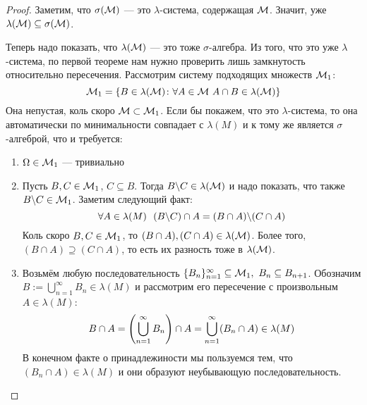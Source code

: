 \begin{proof}
	Заметим, что $\sigma(\mathcal{M})$ --- это $\lambda$-система, содержащая $\mathcal{M}$. Значит, уже $\lambda(\mathcal{M}) \subseteq \sigma(\mathcal{M})$.
	
	Теперь надо показать, что $\lambda(\mathcal{M})$ --- это тоже $\sigma$-алгебра. Из того, что это уже $\lambda$-система, по первой теореме нам нужно проверить лишь замкнутость относительно пересечения. Рассмотрим систему подходящих множеств $\mathcal{M}_1$:
	\[
		\mathcal{M}_1 = \{B \in \lambda(\mathcal{M}) \colon \forall A \in \mathcal{M}\ A \cap B \in \lambda(\mathcal{M})\}
	\]
	Она непустая, коль скоро $\mathcal{M} \subset \mathcal{M}_1$. Если бы покажем, что это $\lambda$-система, то она автоматически по минимальности совпадает с $\lambda(M)$ и к тому же является $\sigma$-алгеброй, что и требуется:
	\begin{enumerate}
		\item $\Omega \in \mathcal{M}_1$ --- тривиально
		
		\item Пусть $B, C \in \mathcal{M}_1$, $C \subseteq B$. Тогда $B \backslash C \in \lambda(\mathcal{M})$ и надо показать, что также $B \backslash C \in \mathcal{M}_1$. Заметим следующий факт:
		\[
			\forall A \in \lambda(M)\ \ (B \backslash C) \cap A = (B \cap A) \backslash (C \cap A)
		\]
		Коль скоро $B, C \in \mathcal{M}_1$, то $(B \cap A), (C \cap A) \in \lambda(\mathcal{M})$. Более того, $(B \cap A) \supseteq (C \cap A)$, то есть их разность тоже в $\lambda(\mathcal{M})$.
		
		\item Возьмём любую последовательность $\{B_n\}_{n = 1}^\infty \subseteq \mathcal{M}_1,\ B_n \subseteq B_{n + 1}$. Обозначим $B := \bigcup_{n = 1}^\infty B_n \in \lambda(M)$ и рассмотрим его пересечение с произвольным $A \in \lambda(M)$:
		\[
			B \cap A = \left(\bigcup_{n = 1}^\infty B_n\right) \cap A = \bigcup_{n = 1}^\infty (B_n \cap A) \in \lambda(M)
		\]
		В конечном факте о принадлежиности мы пользуемся тем, что $(B_n \cap A) \in \lambda(M)$ и они образуют неубывающую последовательность.
	\end{enumerate}
\end{proof}